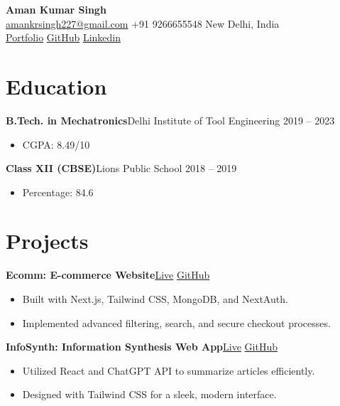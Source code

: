 \documentclass[a4paper,10pt]{article}
\newcommand{\entry}[2]{\textbf{#1}\hfill #2}
\begin{document}
\begin{center}
    {\LARGE \textbf{Aman Kumar Singh}} \\
    \vspace{4pt}
    \href{mailto:amankrsingh227@gmail.com}{amankrsingh227@gmail.com} \textbullet{}
    +91 9266655548 \textbullet{} New Delhi, India \\
    \vspace{4pt}
    \href{https://amankrsingh.vercel.app/}{Portfolio} \textbullet{}
    \href{https://github.com/amanrathore48}{GitHub} \textbullet{}
    \href{https://linkedin.com/in/aman-kr-singh}{Linkedin}
\end{center}

\section*{Education}
\entry{B.Tech. in Mechatronics}{Delhi Institute of Tool Engineering \textbullet{} 2019 -- 2023}
\begin{itemize}[leftmargin=0.5cm]
    \item CGPA: 8.49/10
\end{itemize}

\entry{Class XII (CBSE)}{Lions Public School \textbullet{} 2018 -- 2019}
\begin{itemize}[leftmargin=0.5cm]
    \item Percentage: 84.6%
\end{itemize}
\vspace{2pt}

\section*{Projects}
\entry{Ecomm: E-commerce Website}{\href{https://ecomm-eight-pearl.vercel.app/}{Live} \textbullet{} \href{https://github.com/amanrathore48/Ecomm.}{GitHub}}
\begin{itemize}[leftmargin=0.5cm]
    \item Built with Next.js, Tailwind CSS, MongoDB, and NextAuth.
    \item Implemented advanced filtering, search, and secure checkout processes.
\end{itemize}

\entry{InfoSynth: Information Synthesis Web App}{\href{https://infosynthai.netlify.app/}{Live} \textbullet{} \href{https://github.com/amanrathore48/InfoSynth}{GitHub}}
\begin{itemize}[leftmargin=0.5cm]
    \item Utilized React and ChatGPT API to summarize articles efficiently.
    \item Designed with Tailwind CSS for a sleek, modern interface.
\end{itemize}
\end{document}
